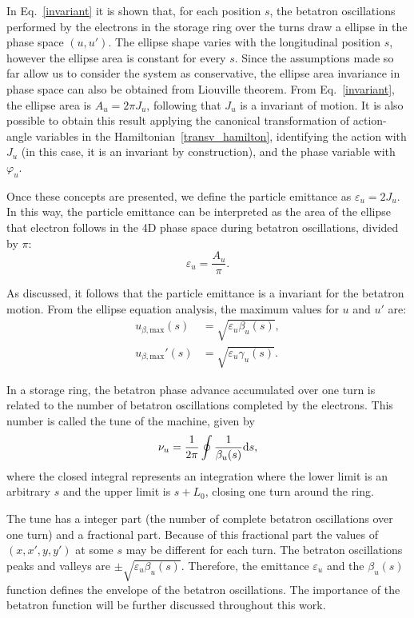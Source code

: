 In Eq.~\eqref{invariant} it is shown that, for each position $s$, the betatron oscillations performed by the electrons in the storage ring over the turns draw a ellipse in the phase space $(u, u')$. The ellipse shape varies with the longitudinal position $s$, however the ellipse area is constant for every $s$. Since the assumptions made so far allow us to consider the system as conservative, the ellipse area invariance in phase space can also be obtained from Liouville theorem. From Eq.~\eqref{invariant}, the ellipse area is $A_u = 2 \pi J_u$, following that $J_u$ is a invariant of motion. It is also possible to obtain this result applying the canonical transformation of action-angle variables in the Hamiltonian~\eqref{transv_hamilton}, identifying the action with $J_u$ (in this case, it is an invariant by construction), and the phase variable with $\varphi_u$.

Once these concepts are presented, we define the particle emittance as $\varepsilon_u = 2J_u$. In this way, the particle emittance can be interpreted as the area of the ellipse that electron follows in the 4D phase space during betatron oscillations, divided by $\pi$:
\begin{equation}
    \varepsilon_u = \frac{A_u}{\pi}.
\end{equation}

As discussed, it follows that the particle emittance is a invariant for the betatron motion. From the ellipse equation analysis, the maximum values for $u$ and $u'$ are:
\begin{align}
    u_{\beta, \mathrm{max}}(s) &= \sqrt{\varepsilon_u \beta_u(s)}, \\
    {u}_{\beta, \mathrm{max}}'(s) &= \sqrt{\varepsilon_u \gamma_u(s)}.
\end{align}

In a storage ring, the betatron phase advance accumulated over one turn is related to the number of betatron oscillations completed by the electrons. This number is called the tune of the machine, given by
\begin{equation}
    \nu_u = \dfrac{1}{2\pi} \oint \dfrac{1}{\beta_u({s})} \mathrm{d} {s},
\end{equation}
where the closed integral represents an integration where the lower limit is an arbitrary $s$ and the upper limit is $s + L_0$, closing one turn around the ring.

The tune has a integer part (the number of complete betatron oscillations over one turn) and a fractional part. Because of this fractional part the values of $(x, x', y, y')$ at some $s$ may be different for each turn. The betraton oscillations peaks and valleys are $\pm \sqrt{\varepsilon_u \beta_u(s)}$. Therefore, the emittance $\varepsilon_u$ and the $\beta_u(s)$ function defines the envelope of the betatron oscillations. The importance of the betatron function will be further discussed throughout this work.

